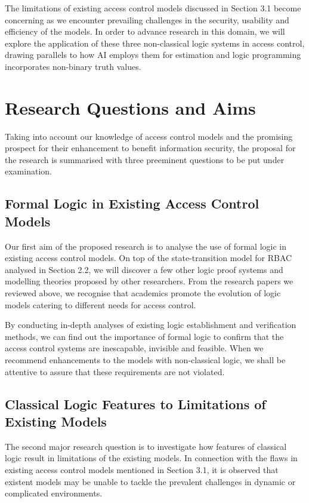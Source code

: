 \documentclass{article}
\begin{document}
The limitations of existing access control models discussed in Section 3.1
become concerning as we encounter prevailing challenges in the security,
usability and efficiency of the models. In order to advance research in
this domain, we will explore the application of these three non-classical
logic systems in access control, drawing parallels to how AI employs them
for estimation and logic programming incorporates non-binary truth values.

\section{Research Questions and Aims}

Taking into account our knowledge of access control models and the promising
prospect for their enhancement to benefit information security, the proposal
for the research is summarised with three preeminent questions to be put
under examination.

\subsection{Formal Logic in Existing Access Control Models}

Our first aim of the proposed research is to analyse the use of formal
logic in existing access control models. On top of the state-transition
model for RBAC analysed in Section 2.2, we will discover a few other logic
proof systems and modelling theories proposed by other researchers. From
the research papers we reviewed above, we recognise that academics promote
the evolution of logic models catering to different needs for access control.

By conducting in-depth analyses of existing logic establishment and
verification methods, we can find out the importance of formal logic to confirm
that the access control systems are inescapable, invisible and feasible. When
we recommend enhancements to the models with non-classical logic, we shall
be attentive to assure that these requirements are not violated.

\subsection{Classical Logic Features to Limitations of Existing Models}

The second major research question is to investigate how features of
classical logic result in limitations of the existing models. In connection
with the flaws in existing access control models mentioned in Section 3.1,
it is observed that existent models may be unable to tackle the prevalent
challenges in dynamic or complicated environments.
\end{document}
